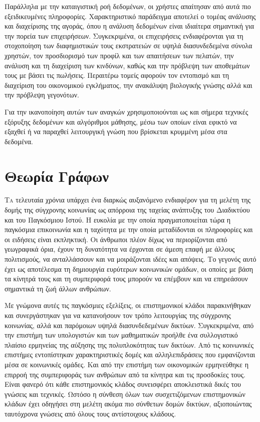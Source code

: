 \documentclass[12pt,twoside]{article}
\newcommand{\en}{\selectlanguage{english}}
\newcommand{\gr}{\selectlanguage{greek}}
\begin{document}
Παράλληλα με την καταιγιστική ροή δεδομένων, οι χρήστες απαίτησαν από αυτά πιο εξειδικευμένες πληροφορίες. Χαρακτηριστικό παράδειγμα αποτελεί ο τομέας ανάλυσης και διαχείρισης της αγοράς, όπου η ανάλυση δεδομένων είναι ιδιαίτερα σημαντική για την πορεία των επιχειρήσεων. Συγκεκριμένα, οι επιχειρήσεις ενδιαφέρονται για τη στοχοποίηση των διαφημιστικών τους εκστρατειών σε υψηλά διασυνδεδεμένα σύνολα χρηστών, τον προσδιορισμό των προφίλ και των απαιτήσεων των πελατών, την ανάλυση και τη διαχείριση των κινδύνων, καθώς και την πρόβλεψη των αποθεμάτων τους με βάσει τις πωλήσεις. Περαιτέρω τομείς αφορούν τον εντοπισμό και τη διαχείριση του οικονομικού εγκλήματος, την ανακάλυψη βιολογικής γνώσης αλλά και την πρόβλεψη γεγονότων.

Για την ικανοποίηση αυτών των αναγκών χρησιμοποιούνται ως και σήμερα τεχνικές εξόρυξης δεδομένων και αλγόριθμοι μάθησης, μέσω των οποίων είναι εφικτό να εξαχθεί ή να παραχθεί λειτουργική γνώση που βρίσκεται κρυμμένη μέσα στα δεδομένα. 




\newpage
\thispagestyle{plain}
\null
\vspace{2cm}
\hspace{-6.5mm}{\textbf{\Huge
 \gr Κεφάλαιο 2}}
\vspace{-4mm}
\section{\gr Θεωρία Γράφων}
\gr
\lettrine[loversize=0.03]{\en T}{\gr α}
τελευταία χρόνια υπάρχει ένα διαρκώς αυξανόμενο ενδιαφέρον για τη μελέτη της δομής της σύγχρονης κοινωνίας ως απόρροια της ταχείας ανάπτυξης του Διαδικτύου και του Παγκόσμιου Ιστού. Η ευκολία με την οποία πραγματοποιείται τώρα η παγκόσμια επικοινωνία και η ταχύτητα με την οποία μεταδίδονται οι πληροφορίες και οι ειδήσεις είναι εκπληκτική. Οι άνθρωποι πλέον δίχως να περιορίζονται από γεωγραφικά όρια, έχουν τη δυνατότητα να έρχονται σε άμεση επαφή με άλλους πολιτισμούς, να ανταλλάσσουν και να μοιράζονται ιδέες και απόψεις. Το γεγονός αυτό έχει ως αποτέλεσμα τη δημιουργία ευρύτερων κοινωνικών ομάδων, οι οποίες με βάση τα κίνητρά τους και τη συμπεριφορά τους μπορούν να επέμβουν και να επηρεάσουν σημαντικά τη ζωή άλλων ανθρώπων. 

Με γνώμονα αυτές τις παγκόσμιες εξελίξεις, οι επιστημονικοί κλάδοι παρακινήθηκαν και συνεργάστηκαν για να κατανοήσουν τον τρόπο λειτουργίας της σύγχρονης κοινωνίας, αλλά και παρόμοιων υψηλά διασυνδεδεμένων δικτύων. Συγκεκριμένα, από την επιστήμη των υπολογιστών και των μαθηματικών προήλθε ένα συλλογιστικό πλαίσιο ερμηνείας της αύξησης της πολυπλοκότητας των δικτύων. Από τις κοινωνικές επιστήμες εντοπίστηκαν χαρακτηριστικές δομές και αλληλεπιδράσεις που εμφανίζονται μέσα σε κοινωνικές ομάδες. Και από την επιστήμη των οικονομικών ερμηνεύθηκε η επιρροή της συμπεριφοράς των ανθρώπων από τα κίνητρα και τις προσδοκίες τους. Είναι φανερό ότι κάθε επιστημονικός κλάδος συνεισφέρει αποκλειστικά δικές του γνώσεις και τεχνικές. Ωστόσο η σύνθεση όλων των συσχετιζόμενων επιστημονικών κλάδων έχει οδηγήσει στη μελέτη ακόμα πιο σύνθετων δομών δικτύων, αξιοποιώντας ταυτόχρονα γνώσεις από όλους τους αντίστοιχους κλάδους. 
\end{document}
